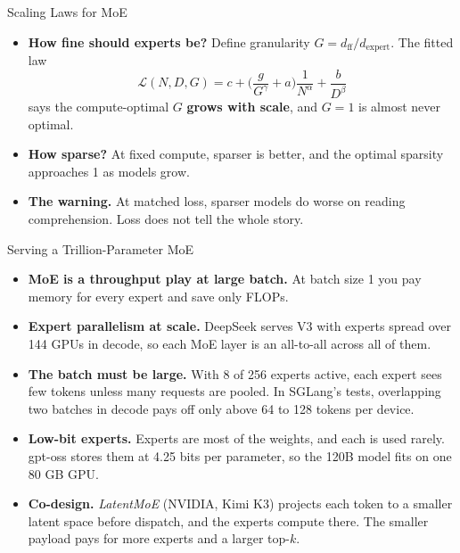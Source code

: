 \begin{frame}{Scaling Laws for MoE}
    \begin{itemize}\itemsep0.5em
        \item \textbf{How fine should experts be?} Define granularity $G = d_{\text{ff}} / d_{\text{expert}}$. The fitted law
        \[
            \mathcal{L}(N,D,G)=c+\Big(\frac{g}{G^{\gamma}}+a\Big)\frac{1}{N^{\alpha}}+\frac{b}{D^{\beta}}
        \]
        says the compute-optimal $G$ \textbf{grows with scale}, and $G=1$ is almost never optimal.
        \item \textbf{How sparse?} At fixed compute, sparser is better, and the optimal sparsity approaches 1 as models grow.
        \item \textbf{The warning.} At matched loss, sparser models do \alert{worse on reading comprehension}. Loss does not tell the whole story.
    \end{itemize}
    \vspace{0.2em}
\end{frame}

\begin{frame}{Serving a Trillion-Parameter MoE}
    \begin{itemize}\itemsep0.3em
        \item \textbf{MoE is a throughput play at large batch.} At batch size 1 you pay memory for every expert and save only FLOPs.
        \item \textbf{Expert parallelism at scale.} DeepSeek serves V3 with experts spread over 144 GPUs in decode, so each MoE layer is an all-to-all across all of them.
        \item \textbf{The batch must be large.} With 8 of 256 experts active, each expert sees few tokens unless many requests are pooled. In SGLang's tests, overlapping two batches in decode pays off only above 64 to 128 tokens per device.
        \item \textbf{Low-bit experts.} Experts are most of the weights, and each is used rarely. gpt-oss stores them at 4.25 bits per parameter, so the 120B model fits on one 80 GB GPU.
        \item \textbf{Co-design.} \emph{LatentMoE} (NVIDIA, Kimi K3) projects each token to a smaller latent space before dispatch, and the experts compute there. The smaller payload pays for more experts and a larger top-$k$.
    \end{itemize}
\end{frame}

